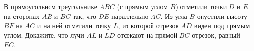 
В прямоугольном треугольнике $ABC$ (с прямым углом $B$)
	отметили точки $D$ и $E$ на сторонах $AB$ и $BC$ так, что
	$DE$ параллельно $AC$. Из угла $B$ опустили высоту $BF$
	на $AC$ и на ней отметили точку $L$, из которой отрезок $AD$ 
	виден под прямым углом. Докажите, что лучи $AL$ и $LD$
	отсекают на прямой $BC$ отрезок, равный $EC$.
